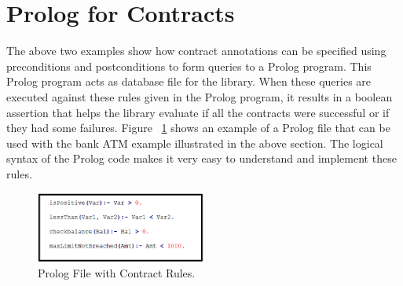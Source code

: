\section{Prolog for Contracts}
The above two examples show how contract annotations can be specified using  preconditions and postconditions to form queries to a Prolog program. This Prolog program acts as database file for the library. When these queries are executed against these rules given in the Prolog program, it results in a boolean assertion that helps the library evaluate if all the contracts were successful or if they had some failures.   
Figure ~\ref{fig:PrologProgram} shows an example of a Prolog file that can be used with the bank ATM example illustrated in the above section. The logical syntax of the Prolog code makes it very easy to understand and implement these rules.

\begin{figure}[htb]
\centering
\includegraphics[width=0.5\textwidth]{images/PrologDatabase.PNG}
\caption{Prolog File with Contract Rules.} 
\label{fig:PrologProgram}
\end{figure} 